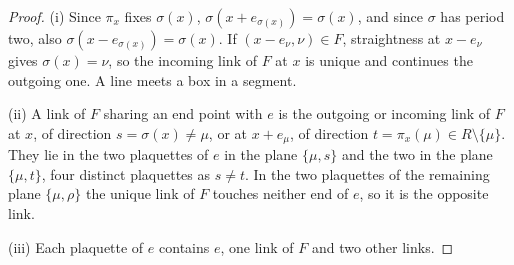 \begin{proof}
(i) Since $\pi_x$ fixes $\sigma(x)$, $\sigma(x+e_{\sigma(x)})=\sigma(x)$, and since
$\sigma$ has period two, also $\sigma(x-e_{\sigma(x)})=\sigma(x)$. If $(x-e_\nu,\nu)
\in F$, straightness at $x-e_\nu$ gives $\sigma(x)=\nu$, so the incoming link of
$F$ at $x$ is unique and continues the outgoing one. A line meets a box in a
segment.

(ii) A link of $F$ sharing an end point with $e$ is the outgoing or incoming
link of $F$ at $x$, of direction $s=\sigma(x)\ne\mu$, or at $x+e_\mu$, of
direction $t=\pi_x(\mu)\in R\setminus\{\mu\}$. They lie in the two plaquettes of
$e$ in the plane $\{\mu,s\}$ and the two in the plane $\{\mu,t\}$, four distinct
plaquettes as $s\ne t$. In the two plaquettes of the remaining plane
$\{\mu,\rho\}$ the unique link of $F$ touches neither end of $e$, so it is the
opposite link.

(iii) Each plaquette of $e$ contains $e$, one link of $F$ and two other links.
\end{proof}

